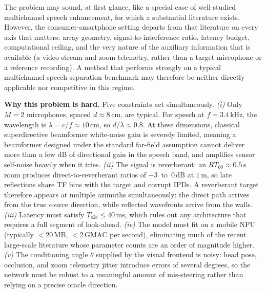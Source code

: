\documentclass[journal,10pt]{IEEEtran}
\begin{document}
The problem may sound, at first glance, like a special case of well-studied multichannel speech enhancement, for which a substantial literature exists. However, the consumer-smartphone setting departs from that literature on every axis that matters: array geometry, signal-to-interference ratio, latency budget, computational ceiling, and the very nature of the auxiliary information that is available (a video stream and zoom telemetry, rather than a target microphone or a reference recording). A method that performs strongly on a typical multichannel speech-separation benchmark may therefore be neither directly applicable nor competitive in this regime.

\textbf{Why this problem is hard.} Five constraints act simultaneously. \emph{(i)} Only \(M=2\) microphones, spaced \(d\!\approx8\,\mathrm{cm}\), are typical. For speech at \(f=3.4\,\mathrm{kHz}\), the wavelength is \(\lambda=c/f\!\approx\!10\,\mathrm{cm}\), so \(d/\lambda\!\approx\!0.8\). At these dimensions, classical superdirective beamformer white-noise gain is severely limited, meaning a beamformer designed under the standard far-field assumption cannot deliver more than a few dB of directional gain in the speech band, and amplifies sensor self-noise heavily when it tries. \emph{(ii)} The signal is reverberant: an \(RT_{60}\!\approx\!0.5\,\mathrm{s}\) room produces direct-to-reverberant ratios of \(-3\)~to~\(0\,\mathrm{dB}\) at \(1\,\mathrm{m}\), so late reflections share TF bins with the target and corrupt IPDs. A reverberant target therefore appears at multiple azimuths simultaneously: the direct path arrives from the true source direction, while reflected wavefronts arrive from the walls. \emph{(iii)} Latency must satisfy \(T_{\mathrm{e2e}}\!\le\!40\,\mathrm{ms}\), which rules out any architecture that requires a full segment of look-ahead. \emph{(iv)} The model must fit on a mobile NPU (typically \(\!<\!20\,\mathrm{MB}\), \(\!<\!2\,\mathrm{GMAC}\) per second), eliminating much of the recent large-scale literature whose parameter counts are an order of magnitude higher. \emph{(v)} The conditioning angle \(\theta\) supplied by the visual frontend is noisy: head pose, occlusion, and zoom telemetry jitter introduce errors of several degrees, so the network must be robust to a meaningful amount of mis-steering rather than relying on a precise oracle direction.
\end{document}
